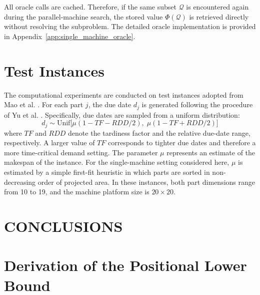 \documentclass[letterpaper, 10 pt, conference]{ieeeconf}  %
\begin{document}
All oracle calls are cached. Therefore, if the same subset $\mathcal{Q}$ is
encountered again during the parallel-machine search, the stored value
$\Phi(\mathcal{Q})$ is retrieved directly without resolving the subproblem.
The detailed oracle implementation is provided in
Appendix~\ref{app:single_machine_oracle}.

\section{Test Instances}
The computational experiments are conducted on test instances adopted from Mao et al. \cite{maoCombinatorialBendersDecomposition2024}. For each part $j$, the due date $d_j$ is generated following the procedure of Yu et al. \cite{yuMathematicalModelsMinimizing2022}. Specifically, due dates are sampled from a uniform distribution:
\begin{equation}
    d_j \sim \text{Unif} \big[ \mu(1 - TF - RDD/2), \; \mu(1 - TF + RDD/2) \big]
\end{equation}
where $TF$ and $RDD$ denote the tardiness factor and the relative due-date range, respectively. A larger value of $TF$ corresponds to tighter due dates and therefore a more time-critical demand setting. The parameter $\mu$ represents an estimate of the makespan of the instance. For the single-machine setting considered here, $\mu$ is estimated by a simple first-fit heuristic in which parts are sorted in non-decreasing order of projected area. In these instances, both part dimensions range from 10 to 19, and the machine platform size is $20 \times 20$.




\section{CONCLUSIONS}







\appendix
\section{Derivation of the Positional Lower Bound}
\label{app:positional_lb}
\end{document}

